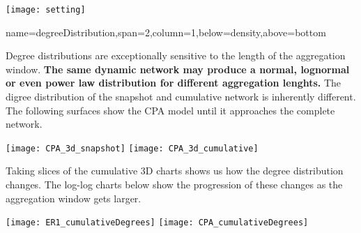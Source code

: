 \documentclass[a0paper,portrait]{baposter}
\begin{document}
\begin{poster}
{\texttt{[image: setting]}
}

{name=degreeDistribution,span=2,column=1,below=density,above=bottom}{
Degree distributions are exceptionally sensitive to the length of the aggregation window. \textbf{The same dynamic network may produce a normal, lognormal or even power law distribution for different aggregation lenghts.} The digree distribution of the snapshot and cumulative network is inherently different. The following surfaces show the CPA model until it approaches the complete network.
\vspace{-0.2em}
\begin{center}
        \texttt{[image: CPA\_3d\_snapshot]}
        \texttt{[image: CPA\_3d\_cumulative]}
\end{center}
\vspace{-0.2em}
Taking slices of the cumulative 3D charts shows us how the degree distribution changes. The log-log charts below show the progression of these changes as the aggregation window gets larger.
\vspace{-0.2em}
\begin{center}
        \texttt{[image: ER1\_cumulativeDegrees]}
        \texttt{[image: CPA\_cumulativeDegrees]}
\end{center}
}

\end{poster}
\end{document}
